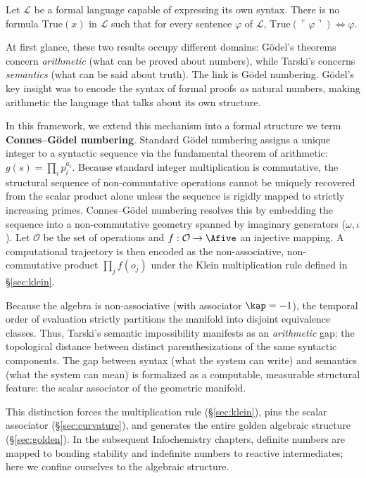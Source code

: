 \begin{theorem}\label{thm:tarski}
Let $\mathcal{L}$ be a formal language capable of expressing its own syntax. There is no formula $\mathrm{True}(x)$ in $\mathcal{L}$ such that for every sentence $\varphi$ of $\mathcal{L}$, $\mathrm{True}(\ulcorner \varphi \urcorner) \iff \varphi$.
\end{theorem}

At first glance, these two results occupy different domains: G\"odel's theorems concern \emph{arithmetic} (what can be proved about numbers), while Tarski's concerns \emph{semantics} (what can be said about truth). The link is G\"odel numbering. G\"odel's key insight was to encode the syntax of formal proofs \emph{as} natural numbers, making arithmetic the language that talks about its own structure. 

In this framework, we extend this mechanism into a formal structure we term \textbf{Connes--G\"odel numbering}. Standard G\"odel numbering assigns a unique integer to a syntactic sequence via the fundamental theorem of arithmetic: $g(s) = \prod_i p_i^{a_i}$. Because standard integer multiplication is commutative, the structural sequence of non-commutative operations cannot be uniquely recovered from the scalar product alone unless the sequence is rigidly mapped to strictly increasing primes. Connes--G\"odel numbering resolves this by embedding the sequence into a non-commutative geometry spanned by imaginary generators ($\omega, \iota$). Let $\mathcal{O}$ be the set of operations and $f: \mathcal{O} \to \Afive$ an injective mapping. A computational trajectory is then encoded as the non-associative, non-commutative product $\prod_{j} f(o_j)$ under the Klein multiplication rule defined in \S\ref{sec:klein}. 

Because the algebra is non-associative (with associator $\kap = -1$), the temporal order of evaluation strictly partitions the manifold into disjoint equivalence classes. Thus, Tarski's semantic impossibility manifests as an \emph{arithmetic} gap: the topological distance between distinct parenthesizations of the same syntactic components. The gap between syntax (what the system can write) and semantics (what the system can mean) is formalized as a computable, measurable structural feature: the scalar associator of the geometric manifold.

\medskip

This distinction forces the multiplication rule (\S\ref{sec:klein}), pins the scalar associator (\S\ref{sec:curvature}), and generates the entire golden algebraic structure (\S\ref{sec:golden}). In the subsequent Infochemistry chapters, definite numbers are mapped to bonding stability and indefinite numbers to reactive intermediates; here we confine ourselves to the algebraic structure.

